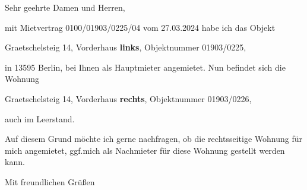\documentclass[fontsize=11pt,version=last,ngerman,parskip]{scrlttr2}
\begin{document}
\begin{letter}{}
  \opening{Sehr geehrte Damen und Herren,} mit Mietvertrag
  0100/01903/0225/04 vom 27.03.2024 habe ich das Objekt

  \hspace*{10mm} Graetschelsteig 14, Vorderhaus \textbf{links},
  Objektnummer 01903/0225,

  in 13595 Berlin, bei Ihnen als Hauptmieter angemietet.  Nun befindet
  sich die Wohnung
  
  \hspace*{10mm} Graetschelsteig 14, Vorderhaus \textbf{rechts},
  Objektnummer 01903/0226,

  auch im Leerstand.

  Auf diesem Grund möchte ich gerne nachfragen, ob die rechtsseitige
  Wohnung für mich angemietet, ggf.\@ mich als Nachmieter für diese Wohnung gestellt
  werden kann.  \closing{Mit freundlichen Grüßen}
\end{letter}
\end{document}
